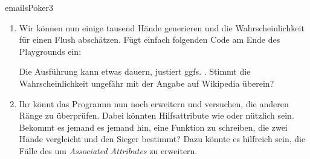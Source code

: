 \documentclass[parskip=half, final]{scrreprt}
\begin{document}
\begin{lecture}
\begin{exc}
\begin{excitem}{emails}{Poker}{3}
\begin{enumerate}[label=\roman*.]
\item Wir können nun einige tausend Hände generieren und die Wahrscheinlichkeit für einen Flush abschätzen. Fügt einfach folgenden Code am Ende des Playgrounds ein:


Die Ausführung kann etwas dauern, justiert ggfs. . Stimmt die Wahrscheinlichkeit ungefähr mit der Angabe auf Wikipedia überein?

\item {} Ihr könnt das Programm nun noch erweitern und versuchen, die anderen Ränge zu überprüfen. Dabei könnten Hilfsattribute wie  oder  nützlich sein. Bekommt es jemand es jemand hin, eine Funktion zu schreiben, die zwei Hände vergleicht und den Sieger bestimmt?  Dazu könnte es hilfreich sein, die Fälle des  um \emph{Associated Attributes} zu erweitern.

\end{enumerate}

\end{excitem}

\end{exc}


\end{lecture}
\end{document}
